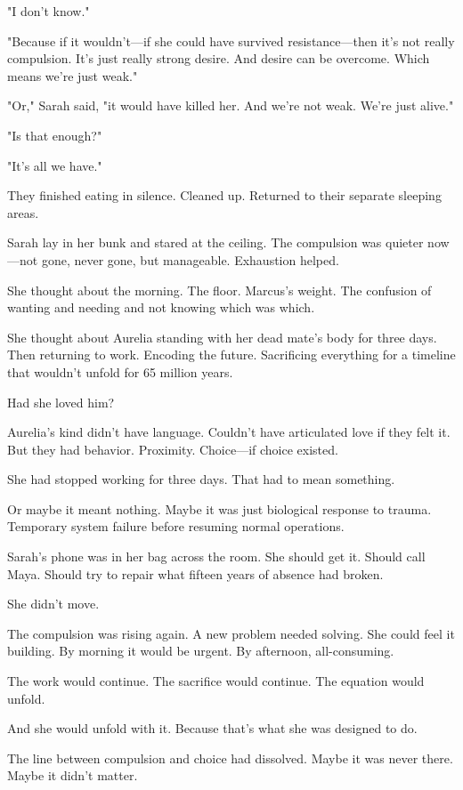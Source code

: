 "I don't know."

"Because if it wouldn't—if she could have survived resistance—then it's not really compulsion. It's just really strong desire. And desire can be overcome. Which means we're just weak."

"Or," Sarah said, "it would have killed her. And we're not weak. We're just alive."

"Is that enough?"

"It's all we have."

They finished eating in silence. Cleaned up. Returned to their separate sleeping areas.

Sarah lay in her bunk and stared at the ceiling. The compulsion was quieter now—not gone, never gone, but manageable. Exhaustion helped.

She thought about the morning. The floor. Marcus's weight. The confusion of wanting and needing and not knowing which was which.

She thought about Aurelia standing with her dead mate's body for three days. Then returning to work. Encoding the future. Sacrificing everything for a timeline that wouldn't unfold for 65 million years.

Had she loved him?

Aurelia's kind didn't have language. Couldn't have articulated love if they felt it. But they had behavior. Proximity. Choice—if choice existed.

She had stopped working for three days. That had to mean something.

Or maybe it meant nothing. Maybe it was just biological response to trauma. Temporary system failure before resuming normal operations.

Sarah's phone was in her bag across the room. She should get it. Should call Maya. Should try to repair what fifteen years of absence had broken.

She didn't move.

The compulsion was rising again. A new problem needed solving. She could feel it building. By morning it would be urgent. By afternoon, all-consuming.

The work would continue. The sacrifice would continue. The equation would unfold.

And she would unfold with it. Because that's what she was designed to do.

The line between compulsion and choice had dissolved. Maybe it was never there. Maybe it didn't matter.

